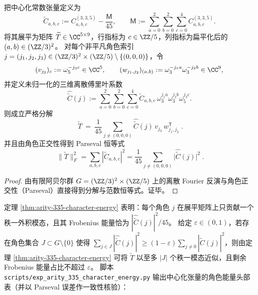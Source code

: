 \begin{theorem}[角色分解 \texorpdfstring{$\Rightarrow$}{=>} 低秩机制：\texorpdfstring{$((3,3,5))$}{(3,3,5)} 的秩一外积分解与 Parseval 能量恒等式]\label{thm:arity-335-character-energy}
把中心化常数张量定义为
\[
\widetilde C_{a,b,c}:=C^{(3,3,5)}_{a,b,c}-\frac{\mathsf{M}}{45},
\qquad
\mathsf{M}:=\sum_{a=0}^2\sum_{b=0}^2\sum_{c=0}^4 C^{(3,3,5)}_{a,b,c}.
\]
将其展平为矩阵 \(\widetilde T\in\CC^{5\times 9}\)，行指标为 \(c\in\ZZ/5\)，列指标为扁平化后的 \((a,b)\in(\ZZ/3)^2\)。
对每个非平凡角色索引 \(j=(j_1,j_2,j_3)\in(\ZZ/3)^2\times(\ZZ/5)\setminus\{(0,0,0)\}\)，令
\[
(v_{j_3})_c:=\omega_5^{-j_3 c}\in\CC^{5},
\qquad
(w_{j_1,j_2})_{(a,b)}:=\omega_3^{-j_1 a}\omega_3^{-j_2 b}\in\CC^{9},
\]
并定义未归一化的三维离散傅里叶系数
\[
\widehat{\widetilde C}(j)
:=
\sum_{a=0}^2\sum_{b=0}^2\sum_{c=0}^4
\widetilde C_{a,b,c}\,\omega_3^{j_1 a}\omega_3^{j_2 b}\omega_5^{j_3 c}.
\]
则成立严格分解
\[
\boxed{\;
\widetilde T
\ =\ 
\frac{1}{45}\sum_{j\neq(0,0,0)}
\widehat{\widetilde C}(j)\,v_{j_3}\,w_{j_1,j_2}^{\mathsf T}\; }.
\]
并且由角色正交性得到 Parseval 恒等式
\[
\boxed{\;
\|\widetilde T\|_F^2
=
\sum_{a,b,c}|\widetilde C_{a,b,c}|^2
=
\frac{1}{45}\sum_{j\neq(0,0,0)}\bigl|\widehat{\widetilde C}(j)\bigr|^2\; }.
\]
\end{theorem}
\begin{proof}
由有限阿贝尔群 \(G=(\ZZ/3)^2\times(\ZZ/5)\) 上的离散 Fourier 反演与角色正交性（Parseval）直接得到分解与范数恒等式。证毕。
\end{proof}

\begin{remark}[可审计诊断：角色能量头部占比 \texorpdfstring{$\Rightarrow$}{=>} 低秩可压缩]\label{rem:arity-335-character-energy-diagnostic}
定理 \ref{thm:arity-335-character-energy} 表明：每个角色 \(j\) 在展平矩阵上只贡献一个秩一外积模态，且其 Frobenius 能量恰为 \(|\widehat{\widetilde C}(j)|^2/45\)。
给定 \(\varepsilon\in(0,1)\)，若存在角色集合 \(J\subset G\setminus\{0\}\) 使得 \(\sum_{j\in J}|\widehat{\widetilde C}(j)|^2\ge (1-\varepsilon)\sum_{j\ne 0}|\widehat{\widetilde C}(j)|^2\)，则由定理 \ref{thm:arity-335-character-energy} 可将 \(\widetilde T\) 以至多 \(|J|\) 个秩一模态近似，且剩余 Frobenius 能量占比不超过 \(\varepsilon\)。
脚本 \texttt{scripts/exp\_arity\_335\_character\_energy.py} 输出中心化张量的角色能量头部表（并以 Parseval 误差作一致性核验）：

\end{remark}


